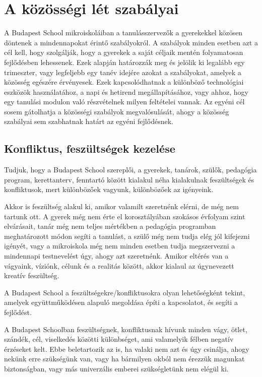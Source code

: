
\section{A közösségi lét szabályai}

A Budapest School mikroiskoláiban a tanulásszervezők a gyerekekkel közösen döntenek a mindennapokat érintő szabályokról. A szabályok minden esetben azt a cél kell, hogy szolgálják, hogy a gyerekek a saját céljaik mentén folyamatosan fejlődésben lehessenek. Ezek alapján határozzák meg és jelölik ki legalább egy trimeszter, vagy legfeljebb egy tanév idejére azokat a szabályokat, amelyek a közösség egészére érvényesek. Ezek kapcsolódhatnak a különböző technológiai eszközök használatához, a napi és hetirend megállapításához, vagy ahhoz, hogy egy tanulási modulon való részvételnek milyen feltételei vannak. 
Az egyéni cél sosem gátolhatja a közösségi szabályok megvalósulását, ahogy a közösség szabályai sem szabhatnak határt az egyéni fejlődésnek. 

\subsection{Konfliktus, feszültségek kezelése}
Tudjuk, hogy a Budapest School szereplői, a gyerekek, tanárok, szülők,
pedagógia program, kerettanterv, fenntartó között kialakul néha
kialakulnak feszültségek és konfliktusok, mert különbözőek vagyunk,
különbözőek az igényeink.

Akkor is feszültség alakul ki, amikor valamilt szeretnénk elérni, de még
nem tartunk ott. A gyerek még nem érte el korosztályában szokásos
évfolyam szint elvárásait, tanár még nem teljes mértékben a pedagógia
programban meghatározott módon segíti a tanulást, a szülő még nem tudja
elég jól kifejezni igényét, vagy a mikroiskola még nem minden esetben
tudja megszervezni a mindennapi testnevelést úgy, ahogy azt szeretnénk.
Amikor eltérés van a vágyaink, víziónk, célunk és a realitás között,
akkor kialaul az úgynevezett kreatív feszültség.

A Budapest School a feszültségekre/konfliktusokra olyan lehetőségként
tekint, amelyek együttműködésen alapuló megoldása építi a kapcsolatot,
és segíti a fejlődést.

A Budapest Schoolban feszültségnek, konfliktusnak hívunk minden vágy,
ötlet, szándék, cél, viselkedés közötti különbséget, ami valamelyik
félben negatív érzéseket kelt. Ebbe beletartozik az is, ha valaki nem
azt és úgy csinálja, ahogy nekünk erre szükségünk van, vagy ha bármilyen
okból nem érezzük magunkat biztonságban, vagy más univerzális emberei
szükségletünk nem elégül ki.

